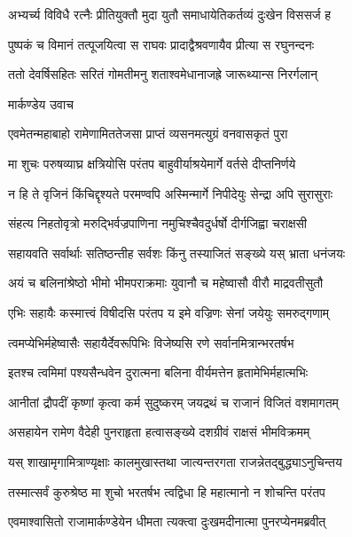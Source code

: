 \twolineshloka
{अभ्यर्च्य विविधै रत्नैः प्रीतियुक्तौ मुदा युतौ}
{समाधायेतिकर्तव्यं दुःखेन विससर्ज ह}


\twolineshloka
{पुष्पकं च विमानं तत्पूजयित्वा स राघवः}
{प्रादाद्वैश्रवणायैव प्रीत्या स रघुनन्दनः}


\twolineshloka
{ततो देवर्षिसहितः सरितं गोमतीमनु}
{शताश्वमेधानाजह्रे जारूथ्यान्स निरर्गलान्}


\twolineshloka
{मार्कण्डेय उवाच}
{}


\twolineshloka
{एवमेतन्महाबाहो रामेणामिततेजसा}
{प्राप्तं व्यसनमत्युग्रं वनवासकृतं पुरा}


\twolineshloka
{मा शुचः परुषव्याघ्र क्षत्रियोसि परंतप}
{बाहुवीर्याश्रयेमार्गे वर्तसे दीप्तनिर्णये}


\twolineshloka
{न हि ते वृजिनं किंचिद्दृश्यते परमण्वपि}
{अस्मिन्मार्गे निपीदेयुः सेन्द्रा अपि सुरासुराः}


\twolineshloka
{संहत्य निहतोवृत्रो मरुद्भिर्वज्रपाणिना}
{नमुचिश्चैवदुर्धर्षो दीर्गजिह्वा चराक्षसी}


\twolineshloka
{सहायवति सर्वार्थाः सतिष्ठन्तीह सर्वशः}
{किंनु तस्याजितं सङ्ख्ये यस् भ्राता धनंजयः}


\twolineshloka
{अयं च बलिनांश्रेष्ठो भीमो भीमपराक्रमाः}
{युवानौ च महेष्वासौ वीरौ माद्रवतीसुतौ}


\twolineshloka
{एभिः सहायैः कस्मात्त्वं विषीदसि परंतप}
{य इमे वज्रिणः सेनां जयेयुः समरुद्गणाम्}


\twolineshloka
{त्वमप्येभिर्महेष्वासैः सहायैर्देवरूपिभिः}
{विजेष्यसि रणे सर्वानमित्रान्भरतर्षभ}


\twolineshloka
{इतश्च त्वमिमां पश्यसैन्धवेन दुरात्मना}
{बलिना वीर्यमत्तेन हृतामेभिर्महात्मभिः}


\twolineshloka
{आनीतां द्रौपदीं कृष्णां कृत्वा कर्म सुदुष्करम्}
{जयद्रथं च राजानं विजितं वशमागतम्}


\twolineshloka
{असहायेन रामेण वैदेही पुनराहृता}
{हत्वासङ्ख्ये दशग्रीवं राक्षसं भीमविक्रमम्}


\twolineshloka
{यस् शाखामृगामित्राण्यृक्षाः कालमुखास्तथा}
{जात्यन्तरगता राजन्नेतद्बुद्ध्याऽनुचिन्तय}


\twolineshloka
{तस्मात्सर्वं कुरुश्रेष्ठ मा शुचो भरतर्षभ}
{त्वद्विधा हि महात्मानो न शोचन्ति परंतप}



\twolineshloka
{एवमाश्वासितो राजामार्कण्डेयेन धीमता}
{त्यक्त्वा दुःखमदीनात्मा पुनरप्येनमब्रवीत्}

